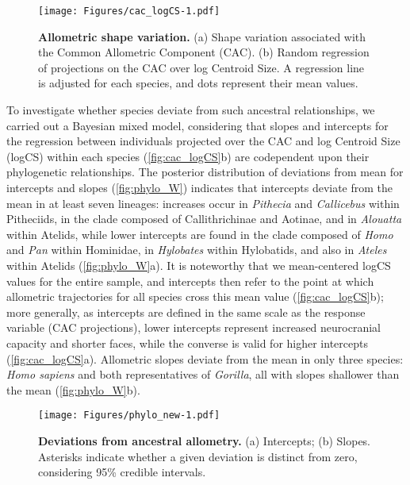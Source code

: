 \documentclass[12pt,twoside]{report}
\begin{document}
\begin{figure}[htbp]
\centering
\texttt{[image: Figures/cac\_logCS-1.pdf]}
\caption{\textbf{Allometric shape variation.} (a) Shape variation
associated with the Common Allometric Component (CAC). (b) Random
regression of projections on the CAC over log Centroid Size. A
regression line is adjusted for each species, and dots represent their
mean values. \label{fig:cac_logCS}}
\end{figure}

To investigate whether species deviate from such ancestral
relationships, we carried out a Bayesian mixed model, considering that
slopes and intercepts for the regression between individuals projected
over the CAC and log Centroid Size (logCS) within each species
(\autoref{fig:cac_logCS}b) are codependent upon their phylogenetic
relationships. The posterior distribution of deviations from mean for
intercepts and slopes (\autoref{fig:phylo_W}) indicates that intercepts
deviate from the mean in at least seven lineages: increases occur in
\emph{Pithecia} and \emph{Callicebus} within Pitheciids, in the clade
composed of Callithrichinae and Aotinae, and in \emph{Alouatta} within
Atelids, while lower intercepts are found in the clade composed of
\emph{Homo} and \emph{Pan} within Hominidae, in \emph{Hylobates} within
Hylobatids, and also in \emph{Ateles} within Atelids
(\autoref{fig:phylo_W}a). It is noteworthy that we mean-centered logCS
values for the entire sample, and intercepts then refer to the point at
which allometric trajectories for all species cross this mean value
(\autoref{fig:cac_logCS}b); more generally, as intercepts are defined in
the same scale as the response variable (CAC projections), lower
intercepts represent increased neurocranial capacity and shorter faces,
while the converse is valid for higher intercepts
(\autoref{fig:cac_logCS}a). Allometric slopes deviate from the mean in
only three species: \emph{Homo sapiens} and both representatives of
\emph{Gorilla}, all with slopes shallower than the mean
(\autoref{fig:phylo_W}b).

\begin{figure}[htbp]
\centering
\texttt{[image: Figures/phylo\_new-1.pdf]}
\caption{\textbf{Deviations from ancestral allometry.} (a) Intercepts;
(b) Slopes. Asterisks indicate whether a given deviation is distinct
from zero, considering 95\% credible intervals. \label{fig:phylo_W}}
\end{figure}
\end{document}
